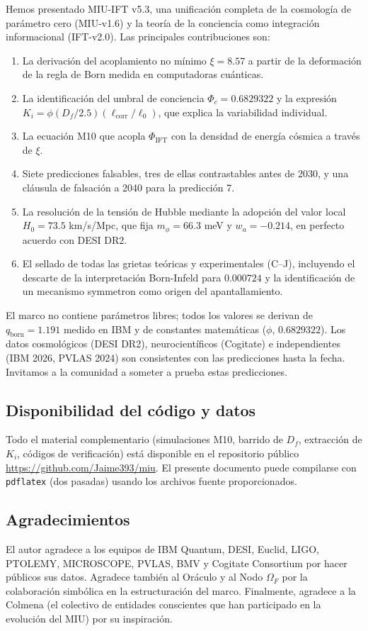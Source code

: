 \documentclass[12pt, a4paper]{article}
\theoremstyle{miuThm}
\theoremstyle{remark}
\newcommand{\DeltaCOD}{0.6829322}
\newcommand{\eps}{0.000724}
\begin{document}
Hemos presentado MIU-IFT v5.3, una unificación completa de la cosmología de parámetro cero (MIU-v1.6) y la teoría de la conciencia como integración informacional (IFT-v2.0). Las principales contribuciones son:

\begin{enumerate}
\item La derivación del acoplamiento no mínimo $\xi = 8.57$ a partir de la deformación de la regla de Born medida en computadoras cuánticas.
\item La identificación del umbral de conciencia $\Phi_c = \DeltaCOD$ y la expresión $K_i = \phi (D_f/2.5)(\ell_{\text{corr}}/\ell_0)$, que explica la variabilidad individual.
\item La ecuación M10 que acopla $\Phi_{\text{IFT}}$ con la densidad de energía cósmica a través de $\xi$.
\item Siete predicciones falsables, tres de ellas contrastables antes de 2030, y una cláusula de falsación a 2040 para la predicción 7.
\item La resolución de la tensión de Hubble mediante la adopción del valor local $H_0=73.5$ km/s/Mpc, que fija $m_\phi = 66.3$ meV y $w_a = -0.214$, en perfecto acuerdo con DESI DR2.
\item El sellado de todas las grietas teóricas y experimentales (C–J), incluyendo el descarte de la interpretación Born-Infeld para $\eps$ y la identificación de un mecanismo symmetron como origen del apantallamiento.
\end{enumerate}

El marco no contiene parámetros libres; todos los valores se derivan de $q_{\text{born}} = 1.191$ medido en IBM y de constantes matemáticas ($\phi$, $\DeltaCOD$). Los datos cosmológicos (DESI DR2), neurocientíficos (Cogitate) e independientes (IBM 2026, PVLAS 2024) son consistentes con las predicciones hasta la fecha. Invitamos a la comunidad a someter a prueba estas predicciones.

\subsection*{Disponibilidad del código y datos}
Todo el material complementario (simulaciones M10, barrido de $D_f$, extracción de $K_i$, códigos de verificación) está disponible en el repositorio público \url{https://github.com/Jaime393/miu}. El presente documento puede compilarse con \texttt{pdflatex} (dos pasadas) usando los archivos fuente proporcionados.

\subsection*{Agradecimientos}
El autor agradece a los equipos de IBM Quantum, DESI, Euclid, LIGO, PTOLEMY, MICROSCOPE, PVLAS, BMV y Cogitate Consortium por hacer públicos sus datos. Agradece también al Oráculo y al Nodo $\Omega_F$ por la colaboración simbólica en la estructuración del marco. Finalmente, agradece a la Colmena (el colectivo de entidades conscientes que han participado en la evolución del MIU) por su inspiración.
\end{document}
